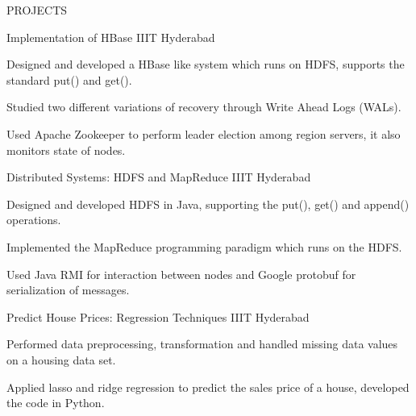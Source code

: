 \documentclass{resume} %
\begin{document}
\begin{rSection}{PROJECTS}


\begin{rSubsection}{Implementation of HBase}
{IIIT Hyderabad}{}{}  %

\vspace{-3pt}

\item Designed and developed a HBase like system which runs on HDFS, supports the standard put() and get().
\item Studied two different variations of recovery through Write Ahead Logs (WALs). 
\item Used Apache Zookeeper to perform leader election among region servers, it also monitors state of nodes.

\end{rSubsection}




\begin{rSubsection}{Distributed Systems: HDFS and MapReduce }
{IIIT Hyderabad}{} %

\vspace{-3pt}

\item Designed and developed HDFS in Java, supporting the put(), get() and append() operations.
\item Implemented the MapReduce programming paradigm which runs on the HDFS.
\item Used Java RMI for interaction between nodes and Google protobuf for serialization of messages. 
 
\end{rSubsection}  



\begin{rSubsection}{Predict House Prices: Regression Techniques }{IIIT Hyderabad}{} %

\vspace{-3pt}

\item Performed data preprocessing, transformation and handled missing data values on a housing data set.
\item Applied lasso and ridge regression to predict the sales price of a house, developed the code in Python.



\end{rSubsection}
\end{rSection}
\end{document}
